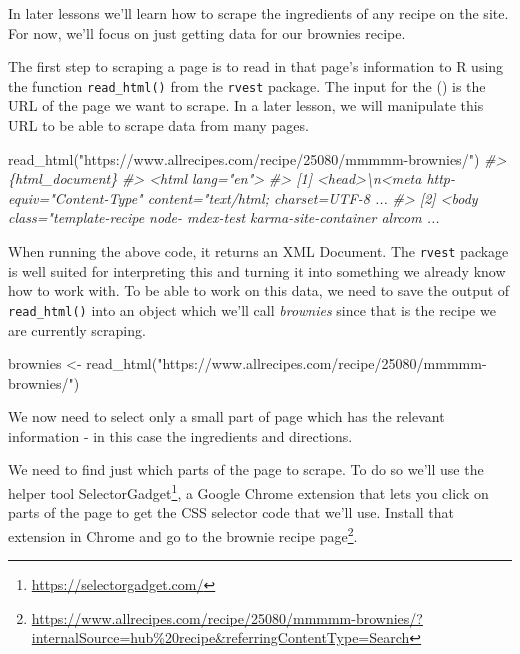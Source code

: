 \documentclass[
]{krantz}
\makeatletter
\newenvironment{Shaded}{\begin{snugshade}}{\end{snugshade}}
\newcommand{\CommentTok}[1]{\textcolor[rgb]{0.37,0.37,0.37}{\textit{#1}}}
\newcommand{\FunctionTok}[1]{\textcolor[rgb]{0,0,0}{#1}}
\newcommand{\NormalTok}[1]{#1}
\newcommand{\OtherTok}[1]{\textcolor[rgb]{0.37,0.37,0.37}{#1}}
\newcommand{\StringTok}[1]{\textcolor[rgb]{0.5,0.5,0.5}{#1}}
\renewcommand{\href}[2]{#2\footnote{\url{#1}}}
\newenvironment{kframe}{%
\medskip{}
\setlength{\fboxsep}{.8em}
 \def\at@end@of@kframe{}%
 \ifinner\ifhmode%
  \def\at@end@of@kframe{\end{minipage}}%
  \begin{minipage}{\columnwidth}%
 \fi\fi%
 \def\FrameCommand##1{\hskip\@totalleftmargin \hskip-\fboxsep
 \colorbox{shadecolor}{##1}\hskip-\fboxsep
     \hskip-\linewidth \hskip-\@totalleftmargin \hskip\columnwidth}%
 \MakeFramed {\advance\hsize-\width
   \@totalleftmargin\z@ \linewidth\hsize
   \@setminipage}}%
 {\par\unskip\endMakeFramed%
 \at@end@of@kframe}
\renewenvironment{Shaded}{\begin{kframe}}{\end{kframe}}
\makeatother
\begin{document}
In later lessons we'll learn how to scrape the ingredients of any recipe on the site. For now, we'll focus on just getting data for our brownies recipe.

The first step to scraping a page is to read in that page's information to R using the function \texttt{read\_html()} from the \texttt{rvest} package. The input for the () is the URL of the page we want to scrape. In a later lesson, we will manipulate this URL to be able to scrape data from many pages.

\begin{Shaded}
\begin{Highlighting}[]
\FunctionTok{read\_html}\NormalTok{(}\StringTok{"https://www.allrecipes.com/recipe/25080/mmmmm{-}brownies/"}\NormalTok{)}
\CommentTok{\#\textgreater{} \{html\_document\}}
\CommentTok{\#\textgreater{} \textless{}html lang="en"\textgreater{}}
\CommentTok{\#\textgreater{} [1] \textless{}head\textgreater{}\textbackslash{}n\textless{}meta http{-}equiv="Content{-}Type" content="text/html; charset=UTF{-}8 ...}
\CommentTok{\#\textgreater{} [2] \textless{}body class="template{-}recipe node{-} mdex{-}test karma{-}site{-}container alrcom  ...}
\end{Highlighting}
\end{Shaded}

When running the above code, it returns an XML Document. The \texttt{rvest} package is well suited for interpreting this and turning it into something we already know how to work with. To be able to work on this data, we need to save the output of \texttt{read\_html()} into an object which we'll call \emph{brownies} since that is the recipe we are currently scraping.

\begin{Shaded}
\begin{Highlighting}[]
\NormalTok{brownies }\OtherTok{\textless{}{-}} \FunctionTok{read\_html}\NormalTok{(}\StringTok{"https://www.allrecipes.com/recipe/25080/mmmmm{-}brownies/"}\NormalTok{)}
\end{Highlighting}
\end{Shaded}

We now need to select only a small part of page which has the relevant information - in this case the ingredients and directions.

We need to find just which parts of the page to scrape. To do so we'll use the helper tool \href{https://selectorgadget.com/}{SelectorGadget}, a Google Chrome extension that lets you click on parts of the page to get the CSS selector code that we'll use. Install that extension in Chrome and go to the \href{https://www.allrecipes.com/recipe/25080/mmmmm-brownies/?internalSource=hub\%20recipe\&referringContentType=Search}{brownie recipe page}.
\end{document}
